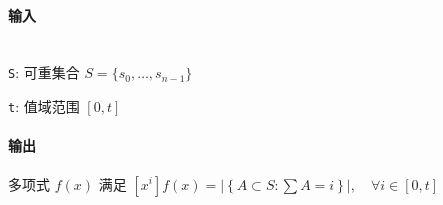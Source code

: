 \paragraph{输入}~\\

\verb|S|: 可重集合 \(S=\{s_0,\dots,s_{n-1}\}\)

\verb|t|: 值域范围 \([0,t]\)

\paragraph{输出}

多项式 \(f(x)\) 满足 \(\left[x^i\right]f(x)=\left|\left\{A\subset S:\sum A=i\right\}\right|,\quad \forall i\in[0,t]\)
